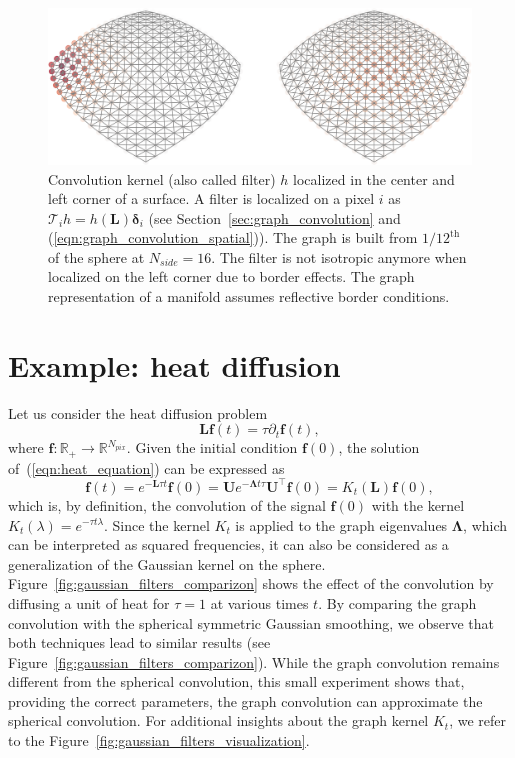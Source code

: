 \documentclass[final,twocolumn,3p,times,sort&compress]{elsarticle}
\newcommand{\figref}[1]{Figure~\ref{fig:#1}}
\newcommand{\secref}[1]{Section~\ref{sec:#1}}
\newcommand{\eqnref}[1]{(\ref{eqn:#1})}
\renewcommand{\b}[1]{{\bm{#1}}}   %
\newcommand{\1}{\b{1}}              %
\newcommand{\0}{\b{0}}              %
\newcommand{\g}[1]{\b{#1}}
\renewcommand{\L}{\b{L}}
\newcommand{\U}{\b{U}}
\newcommand{\trans}{^\intercal}
\newcommand{\R}{\mathbb{R}}
\newcommand{\bLambda}{\b{\Lambda}}
\newcommand{\T}{\mathcal{T}}
\begin{document}
\begin{figure}
	\centering
	\includegraphics[width=\linewidth]{border_effects}
	\caption{Convolution kernel (also called filter) $h$ localized in the center and left corner of a surface. A filter is localized on a pixel $i$ as $\T_i h = h(\L) \b \delta_i$ (see \secref{graph_convolution} and \eqnref{graph_convolution_spatial}). The graph is built from $1/12^\text{th}$ of the sphere at $N_{side} = 16$. The filter is not isotropic anymore when localized on the left corner due to border effects. The graph representation of a manifold assumes reflective border conditions.}
	\label{fig:border_effects}
\end{figure}

\section{Example: heat diffusion}
\label{sec:heat_diffusion}
\label{sec:filter_visualization}

Let us consider the heat diffusion problem
\begin{equation}
  \L \b{f}(t) = \tau \partial_t \b{f}(t),
  \label{eqn:heat_equation}
\end{equation}
where $\b{f}: \R_+ \rightarrow \R^{N_{pix}}$. Given the initial condition
$\b{f}(0)$, the solution of~\eqnref{heat_equation} can be expressed as
\begin{equation*}
  \b{f}(t) = e^{-\L \tau t} \b{f}(0) = \U e^{-\bLambda t \tau} \U\trans \g{f}(0) = K_t(\L) \b{f}(0),
\end{equation*}
which is, by definition, the convolution of the signal $\b{f}(0)$ with the kernel $K_t(\lambda)=e^{-\tau t \lambda}$. Since the kernel $K_t$ is applied to the graph eigenvalues $\bLambda$, which can be interpreted as squared frequencies, it can also be considered as a generalization of the Gaussian kernel on the sphere. \figref{gaussian_filters_comparizon} shows the effect of the convolution by diffusing a unit of heat for $\tau=1$ at various times $t$. By comparing the graph convolution with the spherical symmetric Gaussian smoothing, we observe that both techniques lead to similar results (see \figref{gaussian_filters_comparizon}). While the graph convolution remains different from the spherical convolution, this small experiment shows that, providing the correct parameters, the graph convolution can approximate the spherical convolution. For additional insights about the graph kernel $K_t$, we refer to the \figref{gaussian_filters_visualization}.
\end{document}
